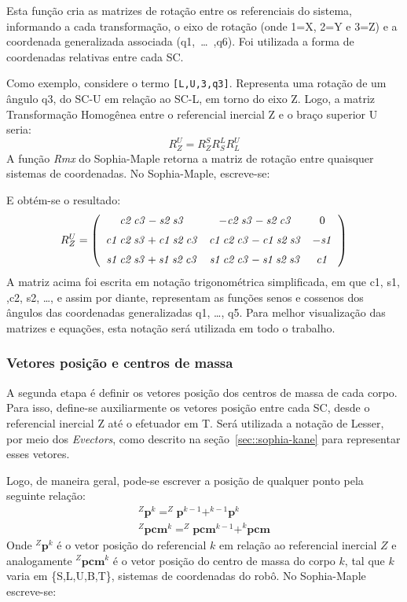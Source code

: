 Esta função cria as matrizes de rotação entre os referenciais do sistema,
informando a cada transformação, o eixo de rotação
(onde 1=X, 2=Y e 3=Z) e a coordenada generalizada associada
(q1,~\ldots~,q6). Foi utilizada a forma de coordenadas relativas entre cada SC.

Como exemplo, considere o termo {\tt [L,U,3,q3]}. Representa uma rotação de um
ângulo q3, do SC-U em relação ao SC-L, em torno do eixo Z.
Logo, a matriz Transformação Homogênea entre o referencial inercial Z e o braço
superior U seria:
%
$$ R_{Z}^{U} = R_{Z}^{S} R_{S}^{L} R_{L}^{U} $$
%
A função \textit{Rmx} do Sophia-Maple retorna a matriz de rotação entre quaisquer
sistemas de coordenadas. No Sophia-Maple, escreve-se:

\medskip {} \medskip 

E obtém-se o resultado:
%
$$ R_{Z}^{U} = \left( \begin {array}{ccc} {\it c2}\,{\it c3}-{\it s2}\,{\it
s3}&-{ \it c2}\,{\it s3}-{\it s2}\,{\it c3}&0\\ \noalign{\medskip}{\it c1}\,{
\it c2}\,{\it s3}+{\it c1}\,{\it s2}\,{\it c3}&{\it c1}\,{\it c2}\,{
\it c3}-{\it c1}\,{\it s2}\,{\it s3}&-{\it s1}\\ \noalign{\medskip}{
\it s1}\,{\it c2}\,{\it s3}+{\it s1}\,{\it s2}\,{\it c3}&{\it s1}\,{
\it c2}\,{\it c3}-{\it s1}\,{\it s2}\,{\it s3}&{\it c1}\end {array}
 \right) $$
 A matriz acima foi escrita em notação trigonométrica simplificada, em que c1,
 s1, ,c2, s2, \ldots, e assim por diante, representam as funções senos e
 cossenos dos ângulos das coordenadas generalizadas q1, \ldots, q5. Para melhor
 visualização das matrizes e equações, esta notação será utilizada em todo o
 trabalho.
 
\subsubsection{Vetores posição e centros de massa}

A segunda etapa é definir os vetores posição dos centros de massa de cada corpo.
Para isso, define-se auxiliarmente os vetores posição entre cada SC, desde o
referencial inercial Z até o efetuador em T. Será utilizada a notação de Lesser,
por meio dos \textit{Evectors}, como descrito na seção~\ref{sec::sophia-kane}
para representar esses vetores.

Logo, de maneira geral, pode-se escrever a posição de qualquer ponto pela
seguinte relação:
%
\begin{align}
	^{Z}\mathbf{p}^{k} = ^{Z}\mathbf{p}^{k-1} + ^{k-1}\mathbf{p}^{k} \\
	^{Z}\mathbf{pcm}^{k} = ^{Z}\mathbf{pcm}^{k-1} + ^{k}\mathbf{pcm}
	\label{eq::pcm}
\end{align}
%
Onde $^{Z}\mathbf{p}^{k}$ é o vetor posição do referencial $k$ em relação ao
referencial inercial $Z$ e analogamente $^{Z}\mathbf{pcm}^{k}$ é o vetor
posição do centro de massa do corpo $k$, tal que $k$ varia em \{S,L,U,B,T\},
sistemas de coordenadas do robô.
No Sophia-Maple escreve-se:

